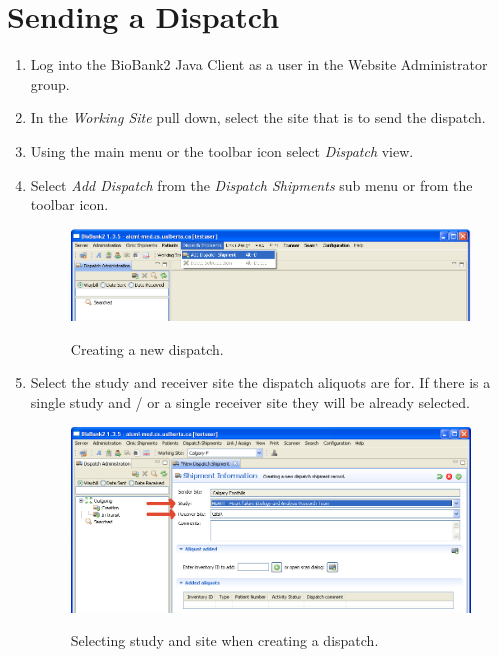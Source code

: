 \section{Sending a Dispatch}
\label{sec:dispatch_send}
\begin{enumerate}
  \item Log into the BioBank2 Java Client as a user in the Website
    Administrator group. %
  \item In the \emph{Working Site} pull down, select the site that is to send the
    dispatch.
  \item Using the main menu or the toolbar icon select \emph{Dispatch} view.
  \item Select \emph{Add Dispatch} from the \emph{Dispatch Shipments} sub menu
    or from the toolbar icon.
    \begin{figure}[H]
      \centering
      \scalebox{0.5}
      { \includegraphics*{screenshots/dispatch/add} }
      \caption{Creating a new dispatch.}
      \label{fig:dispatch_add}
    \end{figure}
  \item Select the study and receiver site the dispatch aliquots are for. If
    there is a single study and / or a single receiver site they will be
    already selected.
    \begin{figure}[H]
      \centering
      \scalebox{0.5}
      { \includegraphics*{screenshots/dispatch/add_entry} }
      \caption{Selecting study and site when creating a dispatch.}
      \label{fig:dispatch_add_entry}

\end{figure}
\end{enumerate}
